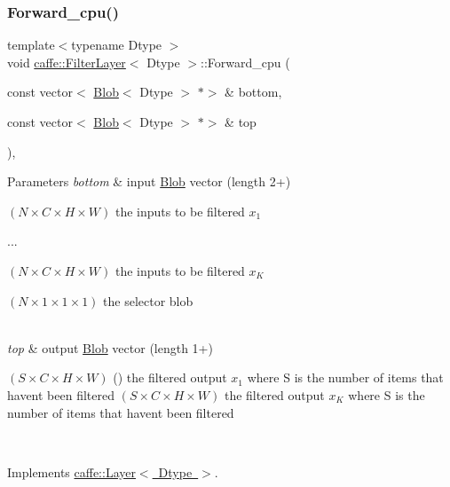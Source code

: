 \subsubsection{\texorpdfstring{Forward\+\_\+cpu()}{Forward\_cpu()}\hspace{0.1cm}{\footnotesize\ttfamily [1/2]}}
{\footnotesize\ttfamily template$<$typename Dtype $>$ \\
void \mbox{\hyperlink{classcaffe_1_1_filter_layer}{caffe\+::\+Filter\+Layer}}$<$ Dtype $>$\+::Forward\+\_\+cpu (\begin{DoxyParamCaption}\item[{const vector$<$ \mbox{\hyperlink{classcaffe_1_1_blob}{Blob}}$<$ Dtype $>$ $\ast$$>$ \&}]{bottom,  }\item[{const vector$<$ \mbox{\hyperlink{classcaffe_1_1_blob}{Blob}}$<$ Dtype $>$ $\ast$$>$ \&}]{top }\end{DoxyParamCaption})\hspace{0.3cm}{\ttfamily [protected]}, {\ttfamily [virtual]}}


\begin{DoxyParams}{Parameters}
{\em bottom} & input \mbox{\hyperlink{classcaffe_1_1_blob}{Blob}} vector (length 2+)
\begin{DoxyEnumerate}
\item $ (N \times C \times H \times W) $ the inputs to be filtered $ x_1 $
\item ...
\item $ (N \times C \times H \times W) $ the inputs to be filtered $ x_K $
\item $ (N \times 1 \times 1 \times 1) $ the selector blob 
\end{DoxyEnumerate}\\
\hline
{\em top} & output \mbox{\hyperlink{classcaffe_1_1_blob}{Blob}} vector (length 1+)
\begin{DoxyEnumerate}
\item $ (S \times C \times H \times W) $ () the filtered output $ x_1 $ where S is the number of items that haven\textquotesingle{}t been filtered $ (S \times C \times H \times W) $ the filtered output $ x_K $ where S is the number of items that haven\textquotesingle{}t been filtered 
\end{DoxyEnumerate}\\
\hline
\end{DoxyParams}


Implements \mbox{\hyperlink{classcaffe_1_1_layer_a576ac6a60b1e99fe383831f52a6cea77}{caffe\+::\+Layer$<$ Dtype $>$}}.

